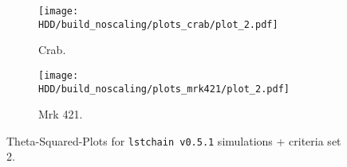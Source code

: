 \begin{figure}
    \centering
    \begin{subfigure}{0.49\textwidth}
        \centering
        \texttt{[image: HDD/build\_noscaling/plots\_crab/plot\_2.pdf]}
        \caption{Crab.}
        \label{fig:crab_oldMC_150}
    \end{subfigure}
    \hfill
    \begin{subfigure}{0.49\textwidth}
        \centering
        \texttt{[image: HDD/build\_noscaling/plots\_mrk421/plot\_2.pdf]}
        \caption{Mrk 421.}
        \label{fig:mrk_oldMC_150}
    \end{subfigure}
    \caption{Theta-Squared-Plots for \texttt{lstchain v0.5.1} simulations + criteria set 2.}
\end{figure}